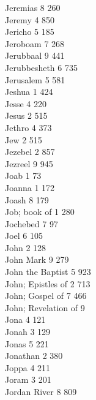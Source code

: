 Jeremias \hfill 8 \quad \phantom{0}260\\
Jeremy \hfill 4 \quad \phantom{0}850\\
Jericho \hfill 5 \quad \phantom{0}185\\
Jeroboam \hfill 7 \quad \phantom{0}268\\
Jerubbaal \hfill 9 \quad \phantom{0}441\\
Jerubbesheth \hfill 6 \quad \phantom{0}735\\
Jerusalem \hfill 5 \quad \phantom{0}581\\
Jeshua \hfill 1 \quad \phantom{0}424\\
Jesse \hfill 4 \quad \phantom{0}220\\
Jesus \hfill 2 \quad \phantom{0}515\\
Jethro \hfill 4 \quad \phantom{0}373\\
Jew \hfill 2 \quad \phantom{0}515\\
Jezebel \hfill 2 \quad \phantom{0}857\\
Jezreel \hfill 9 \quad \phantom{0}945\\
Joab \hfill 1 \quad \phantom{0}\phantom{0}73\\
Joanna \hfill 1 \quad \phantom{0}172\\
Joash \hfill 8 \quad \phantom{0}179\\
Job; book of \hfill 1 \quad \phantom{0}280\\
Jochebed \hfill 7 \quad \phantom{0}\phantom{0}97\\
Joel \hfill 6 \quad \phantom{0}105\\
John \hfill 2 \quad \phantom{0}128\\
John Mark \hfill 9 \quad \phantom{0}279\\
John the Baptist \hfill 5 \quad \phantom{0}923\\
John; Epistles of \hfill 2 \quad \phantom{0}713\\
John; Gospel of \hfill 7 \quad \phantom{0}466\\
John; Revelation of \hfill 9 \\
Jona \hfill 4 \quad \phantom{0}121\\
Jonah \hfill 3 \quad \phantom{0}129\\
Jonas \hfill 5 \quad \phantom{0}221\\
Jonathan \hfill 2 \quad \phantom{0}380\\
Joppa \hfill 4 \quad \phantom{0}211\\
Joram \hfill 3 \quad \phantom{0}201\\
Jordan River \hfill 8 \quad \phantom{0}809\\

